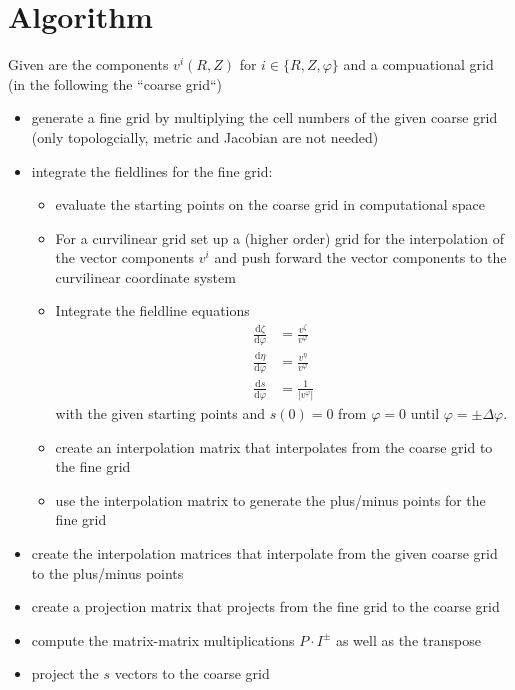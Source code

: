 \documentclass{hitec} %
\renewcommand{\d}{\mathrm{d}}
\begin{document}
\section{Algorithm}
Given are the components $v^i(R,Z)$ for $i\in\{R,Z,\varphi\}$ and a compuational grid (in the following the ``coarse grid``)
\begin{itemize}
  \item generate a fine grid by multiplying the cell numbers of the given coarse grid (only topologcially, metric and Jacobian are not needed)
  \item integrate the fieldlines for the fine grid:
    \begin{itemize}
      \item evaluate the starting points on the coarse grid in computational space 
      \item For a curvilinear grid set up a (higher order) grid for the 
        interpolation of the vector components $v^i$ and push forward the vector components
        to the curvilinear coordinate system
      \item Integrate the fieldline equations 
\begin{subequations}
\begin{align}
\frac{\d \zeta}{\d\varphi} &= \frac{v^\zeta}{v^\varphi}\\
\frac{\d \eta}{\d\varphi} &= \frac{v^\eta}{v^\varphi}\\
\frac{\d s}{\d\varphi} &= \frac{1}{|v^\varphi|}
\end{align}
\label{eq:fieldlines_converted}
\end{subequations}
    with the given starting points and $s(0)=0$ from $\varphi=0$ until $\varphi = \pm\Delta \varphi$.
      \item create an interpolation matrix that interpolates from the coarse grid 
        to the fine grid
      \item use the interpolation matrix to generate the plus/minus points for the fine grid
    \end{itemize}
  \item create the interpolation matrices that interpolate from the given coarse grid 
    to the plus/minus points 
  \item create a projection matrix that projects from the fine grid to the coarse grid
  \item compute the matrix-matrix multiplications $P\cdot I^\pm$ as well as the transpose
  \item project the $s$ vectors to the coarse grid
\end{itemize}
\end{document}
